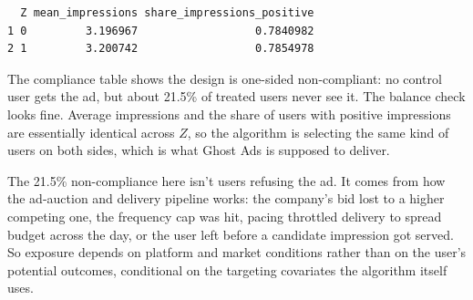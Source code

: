 \begin{Shaded}
\begin{Highlighting}[]
\OtherTok{\textless{}{-}} \NormalTok{(}
   \NormalTok{(}\NormalTok{, }\NormalTok{),}
   \NormalTok{(}\SpecialCharTok{$}\NormalTok{impressions[data}\SpecialCharTok{$}\SpecialCharTok{==} \NormalTok{]),}
                       \SpecialCharTok{$}\NormalTok{impressions[data}\SpecialCharTok{$}\SpecialCharTok{==} \NormalTok{])),}
   \NormalTok{(}\SpecialCharTok{$}\NormalTok{impressions[data}\SpecialCharTok{$}\SpecialCharTok{==} \NormalTok{] }\SpecialCharTok{\textgreater{}} \NormalTok{),}
                                 \SpecialCharTok{$}\NormalTok{impressions[data}\SpecialCharTok{$}\SpecialCharTok{==} \NormalTok{] }\SpecialCharTok{\textgreater{}} \NormalTok{))}
\NormalTok{)}
\end{Highlighting}
\end{Shaded}

\begin{verbatim}
  Z mean_impressions share_impressions_positive
1 0         3.196967                  0.7840982
2 1         3.200742                  0.7854978
\end{verbatim}

The compliance table shows the design is one-sided non-compliant: no
control user gets the ad, but about 21.5\% of treated users never see
it. The balance check looks fine. Average impressions and the share of
users with positive impressions are essentially identical across \(Z\),
so the algorithm is selecting the same kind of users on both sides,
which is what Ghost Ads is supposed to deliver.

The 21.5\% non-compliance here isn't users refusing the ad. It comes
from how the ad-auction and delivery pipeline works: the company's bid
lost to a higher competing one, the frequency cap was hit, pacing
throttled delivery to spread budget across the day, or the user left
before a candidate impression got served. So exposure depends on
platform and market conditions rather than on the user's potential
outcomes, conditional on the targeting covariates the algorithm itself
uses.

